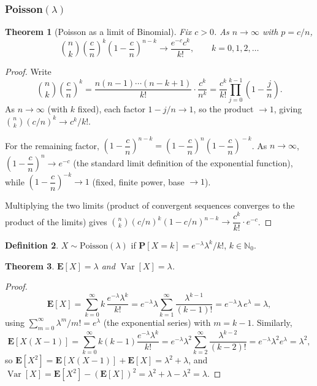 \documentclass[11pt]{article}
\theoremstyle{definition}
\newtheorem{definition}{Definition}[section]
\theoremstyle{plain}
\newtheorem{theorem}[definition]{Theorem}
\theoremstyle{remark}
\newcommand{\E}[1]{\mathbf{E}\!\left[#1\right]}
\newcommand{\Var}[1]{\operatorname{Var}\!\left[#1\right]}
\newcommand{\Nz}{\mathbb{N}_0}
\begin{document}
\subsubsection{Poisson$(\lambda)$}

\begin{theorem}[Poisson as a limit of Binomial]
\label{thm:poisson-limit}
Fix $c>0$. As $n\to\infty$ with $p=c/n$,
\[
\binom{n}{k}\left(\frac{c}{n}\right)^{\!k}\left(1-\frac{c}{n}\right)^{\!n-k}
\longrightarrow \frac{e^{-c}c^k}{k!}, \qquad k=0,1,2,\dots
\]
\end{theorem}
\begin{proof}
Write
\[
\binom{n}{k}\left(\frac{c}{n}\right)^{\!k} = \frac{n(n-1)\cdots(n-k+1)}{k!}\cdot\frac{c^k}{n^k}
= \frac{c^k}{k!}\prod_{j=0}^{k-1}\left(1-\frac{j}{n}\right).
\]
As $n\to\infty$ (with $k$ fixed), each factor $1-j/n \to 1$, so the product $\to 1$, giving
$\binom{n}{k}(c/n)^k \to c^k/k!$.

For the remaining factor, $\left(1-\dfrac{c}{n}\right)^{n-k} =
\left(1-\dfrac{c}{n}\right)^{\!n}\left(1-\dfrac{c}{n}\right)^{\!-k}$. As $n\to\infty$,
$\left(1-\dfrac{c}{n}\right)^{n}\to e^{-c}$ (the standard limit definition of the exponential
function), while $\left(1-\dfrac{c}{n}\right)^{-k}\to 1$ (fixed, finite power, base $\to 1$).

Multiplying the two limits (product of convergent sequences converges to the product of the
limits) gives $\binom{n}{k}(c/n)^k(1-c/n)^{n-k} \to \dfrac{c^k}{k!}\cdot e^{-c}$.
\end{proof}

\begin{definition}
$X\sim\text{Poisson}(\lambda)$ if $\mathbf{P}[X=k] = e^{-\lambda}\lambda^k/k!$, $k\in\Nz$.
\end{definition}

\begin{theorem}
$\E{X}=\lambda$ and $\Var{X}=\lambda$.
\end{theorem}
\begin{proof}
\[
\E{X} = \sum_{k=0}^\infty k\,\frac{e^{-\lambda}\lambda^k}{k!}
= e^{-\lambda}\lambda\sum_{k=1}^\infty \frac{\lambda^{k-1}}{(k-1)!}
= e^{-\lambda}\lambda\, e^{\lambda} = \lambda,
\]
using $\sum_{m=0}^\infty \lambda^m/m! = e^\lambda$ (the exponential series) with $m=k-1$. Similarly,
\[
\E{X(X-1)} = \sum_{k=0}^\infty k(k-1)\frac{e^{-\lambda}\lambda^k}{k!}
= e^{-\lambda}\lambda^2 \sum_{k=2}^\infty \frac{\lambda^{k-2}}{(k-2)!} = e^{-\lambda}\lambda^2 e^\lambda
= \lambda^2,
\]
so $\E{X^2}=\E{X(X-1)}+\E{X}=\lambda^2+\lambda$, and $\Var{X}=\E{X^2}-(\E{X})^2=\lambda^2+\lambda-\lambda^2=\lambda$.
\end{proof}
\end{document}
